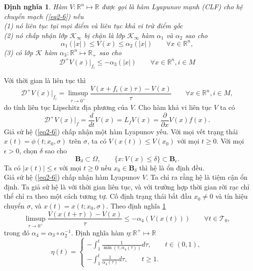 \documentclass[14pt,a4paper,oneside]{report}		%
\newtheorem{define}[theorem]{Định nghĩa}
\begin{document}
\begin{define} \label{def2-4}
Hàm $V:\mathbb{R}^n\mapsto\mathbb{R}$ được gọi là hàm Lyapunov mạnh (CLF) cho hệ chuyển mạch (\ref{eq2-6}) nếu\\
(1) nó liên tục tại mọi điểm và liên tục khả vi trừ điểm gốc\\
(2) nó chấp nhận lớp $\mathcal{K}_\infty$ bị chặn là lớp $\mathcal{K}_\infty$ hàm $\alpha_1$ và $\alpha_2$ sao cho
$$\alpha_1(|x|)\leq V(x)\leq \alpha_2(|x|)\qquad\forall x\in\mathbb{R}^n,$$
(3) có lớp $\mathcal{K}$ hàm $\alpha_3: \mathbb{R}^n\mapsto\mathbb{R}_+$ sao cho
\begin{equation} \label{eq2-7}
\mathcal{D}^+V(x)|_{f_i}\leq -\alpha_3(|x|)\qquad\forall x\in\mathbb{R}^n, i\in M
\end{equation}
\end{define}
Với thời gian là liên tục thì
\begin{equation} \label{eq2-8}
\mathcal{D}^+V(x)|_{f_i}=\limsup_{\tau\rightarrow 0^+}\frac{V(x+f_i(x)\tau)-V(x)}{\tau}\qquad\forall x\in\mathbb{R}^n,i\in M,
\end{equation}
do tính liên tục Lipschitz địa phương của $V$. Cho hàm khả vi liên tục $V$ ta có
$$\mathcal{D}^+V(x)|_f=\frac{d}{dt}V(x)=L_fV(x)=\frac{\partial}{\partial x}V(x)f(x).$$
Giả sử hệ (\ref{eq2-6}) chấp nhận một hàm Lyapunov yếu. Với mọi vết trạng thái $x(t)=\phi(t;x_0,\sigma)$ trên $\sigma$, ta có $V(x(t))\leq V(x_0)$ với mọi $t\geq 0$. Với mọi $\epsilon >0$, chọn $\delta$ sao cho
$$\mathbf{B}_\delta\subset\Omega , \qquad\{x:V(x)\leq\delta\}\subset\mathbf{B}_\epsilon .$$
Ta có $|x(t)|\leq\epsilon$ với mọi $t\geq 0$ nếu $x_0 \in\mathbf{B}_\delta$ thì hệ là ổn định đều.\\
Giả sử hệ (\ref{eq2-6}) chấp nhận hàm Lyapunov $V$. Ta chỉ ra rằng hệ là tiệm cận ổn định. Ta giả sử hệ là với thời gian liên tục, và với trường hợp thời gian rời rạc chỉ thể chỉ ra theo một cách tương tự. Cố định trạng thái bắt đầu $x_0 \neq 0$ và tín hiệu chuyển $\sigma$, và $x(t)=x(t;x_0,\sigma)$. Theo định nghĩa \ref{def2-4}
\begin{equation} \label{eq2-9}
\limsup_{\tau\rightarrow 0^+}\frac{V(x(t+\tau))-V(x)}{\tau}\leq -\alpha_4(V(x(t)))\qquad\forall t\in\mathcal{T}_0,
\end{equation}
trong đó $\alpha_4 = \alpha_3\circ\alpha_2^{-1}$. Định nghĩa hàm $\eta : \mathbb{R}^+\mapsto\mathbb{R}$
$$
\eta (t) = \left\{
\begin{array}{l}
-\int_1^t\frac{1}{\min(\tau,\alpha_4(\tau))}d\tau ,\qquad t\in (0,1),\\
-\int_1^t\frac{1}{\alpha_4(\tau)}d\tau , \qquad t\geq 1.
\end{array}\right.
$$
\end{document}
